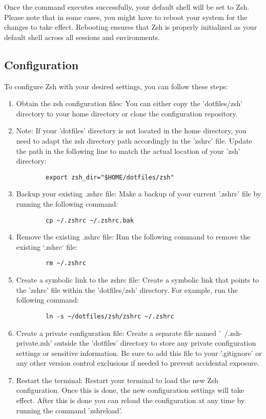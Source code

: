\documentclass{article}
\begin{document}
Once the command executes successfully, your default shell will be set to Zsh.
Please note that in some cases, you might have to reboot your system for the 
changes to take effect. Rebooting ensures that Zsh is properly initialized as 
your default shell across all sessions and environments.

\subsection{Configuration}
To configure Zsh with your desired settings, you can follow these steps:

\begin{enumerate}
  \item Obtain the zsh configuration files: You can either copy the 
	  'dotfiles/zsh' directory to your home directory or clone the 
		configuration repository.

  \item Note: If your 'dotfiles' directory is not located in the home 
	  directory, you need to adapt the zsh directory path accordingly in the
		'zshrc' file. Update the path in the following line to match the actual 
		location of your 'zsh' directory:
		\begin{verbatim}
		export zsh_dir="$HOME/dotfiles/zsh"
		\end{verbatim}

  \item Backup your existing .zshrc file: Make a backup of your current
	  '.zshrc' file by running the following command:
  		\begin{verbatim}
  		cp ~/.zshrc ~/.zshrc.bak
  		\end{verbatim}

  \item Remove the existing .zshrc file: Run the following command to remove 
	  the existing `.zshrc` file:
  		\begin{verbatim}
  		rm ~/.zshrc
  		\end{verbatim}

  \item Create a symbolic link to the zshrc file: Create a symbolic link that 
	  points to the 'zshrc' file within the 'dotfiles/zsh' directory. For 
		example, run the following command:
  		\begin{verbatim}
  		ln -s ~/dotfiles/zsh/zshrc ~/.zshrc
  		\end{verbatim}

  \item Create a private configuration file: Create a separate file named
	  '~/.zsh-private.zsh' outside the 'dotfiles' directory to store any 
		private configuration settings or sensitive information. Be sure to 
		add this file to your '.gitignore' or any other version control 
		exclusions if needed to prevent accidental exposure.

  \item Restart the terminal: Restart your terminal to load the new Zsh 
	  configuration. Once this is done, the new configuration settings will 
		take effect. After this is done you can reload the configuration at 
		any time by running the command 'zshreload'.
\end{enumerate}
\end{document}
